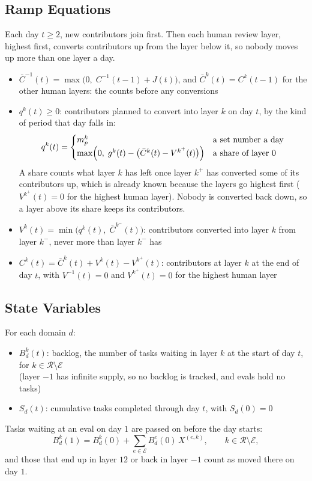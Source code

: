 \documentclass{article}
\begin{document}
\subsection*{Ramp Equations}
Each day $t \ge 2$, new contributors join first. Then each human review layer, highest first, converts contributors up from the layer below it, so nobody moves up more than one layer a day.
\begin{itemize}
  \item $\bar{C}^{-1}(t) = \max\bigl(0,\; C^{-1}(t-1) + J(t)\bigr)$, and $\bar{C}^k(t) = C^k(t-1)$ for the other human layers: the counts before any conversions

  \item $q^k(t) \ge 0$: contributors planned to convert into layer $k$ on day $t$, by the kind of period that day falls in:
  \[
    q^k(t) =
    \begin{cases}
      m^k_p & \text{a set number a day} \\
      \max\Bigl(0,\; g^k(t) - \bigl(\bar{C}^k(t) - V^{k^+}(t)\bigr)\Bigr) & \text{a share of layer $0$}
    \end{cases}
  \]
  A share counts what layer $k$ has left once layer $k^+$ has converted some of its contributors up, which is already known because the layers go highest first ($V^{k^+}(t) = 0$ for the highest human layer). Nobody is converted back down, so a layer above its share keeps its contributors.

  \item $V^k(t) = \min\bigl(q^k(t),\; \bar{C}^{k^-}(t)\bigr)$: contributors converted into layer $k$ from layer $k^-$, never more than layer $k^-$ has

  \item $C^k(t) = \bar{C}^k(t) + V^k(t) - V^{k^+}(t)$: contributors at layer $k$ at the end of day $t$, with $V^{-1}(t) = 0$ and $V^{k^+}(t) = 0$ for the highest human layer
\end{itemize}

\subsection*{State Variables}
For each domain $d$:
\begin{itemize}
  \item $B^k_d(t)$: backlog, the number of tasks waiting in layer $k$ at the start of day $t$, for $k \in \mathcal{R} \setminus \mathcal{E}$ \\
  (layer $-1$ has infinite supply, so no backlog is tracked, and evals hold no tasks)

  \item $S_d(t)$: cumulative tasks completed through day $t$, with $S_d(0) = 0$
\end{itemize}
Tasks waiting at an eval on day $1$ are passed on before the day starts:
\[
  B^k_d(1) = B^k_d(0) + \sum_{e \in \mathcal{E}} B^e_d(0)\, X^{(e,k)}, \qquad k \in \mathcal{R} \setminus \mathcal{E},
\]
and those that end up in layer $12$ or back in layer $-1$ count as moved there on day $1$.
\end{document}
